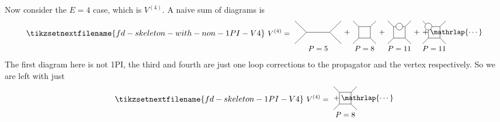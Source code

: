 \documentclass[fleqn]{NotesClass}
\begin{document}
    Now consider the \(E = 4\) case, which is \(V^{(4)}\).
    A naive sum of diagrams is
    \begin{equation}
        \tikzsetnextfilename{fd-skeleton-with-non-1PI-V4}
        \begin{tikzpicture}[
            baseline = (V.base),
            font=\small
            ]
            \node[left] (V) at (0, 0) {\(V^{(4)} = {}\)};
            \draw (0, -0.5) -- (0.5, 0);
            \draw (0, 0.5) -- (0.5, 0);
            \draw (0.5, 0) -- (1.5, 0);
            \draw (1.5, 0) -- (2, -0.5);
            \draw (1.5, 0) -- (2, 0.5);
            \node at (2.25, 0) {\(+\)};
            \node at (1, -0.7) {\(P = 5\)};
            \draw (2.75, -0.25) rectangle (3.25, 0.25);
            \draw (2.75, -0.25) -- (2.5, -0.5);
            \draw (2.75, 0.25) -- (2.5, 0.5);
            \draw (3.25, -0.25) -- (3.5, -0.5);
            \draw (3.25, 0.25) -- (3.5, 0.5);
            \node at (3, -0.7) {\(P = 8\)};
            \node at (3.75, 0) {\(+\)};
            \draw (4.65, 0.25) -- (4.75, 0.25) -- (4.75, -0.25) -- (4.25, -0.25) -- (4.25, 0.25) -- (4.35, 0.25);
            \draw (4.5, 0.25) circle [radius=0.15];
            \draw (4.25, -0.25) -- (4, -0.5);
            \draw (4.25, 0.25) -- (4, 0.5);
            \draw (4.75, -0.25) -- (5, -0.5);
            \draw (4.75, 0.25) -- (5, 0.5);
            \node at (4.5, -0.7) {\(P = 11\)};
            \node at (5.25, 0) {\(+\)};
            \draw (5.9, 0.25) -- (6.25, 0.25) -- (6.25, -0.25) -- (5.75, -0.25) -- (5.75, 0.1);
            \draw (5.75, 0.25) circle [radius = 0.15];
            \draw (5.75, -0.25) -- (5.5, -0.5);
            \draw (5.5, 0.5) -- ++ (-45:0.2);
            \draw (6.25, -0.25) -- (6.5, -0.5);
            \draw (6.25, 0.25) -- (6.5, 0.5);
            \node at (6, -0.7) {\(P = 11\)};
            \node at (6.75, 0) {\({} + \mathrlap{\dotsb}\)};
            \node at (7.25, 0) {};
        \end{tikzpicture}
    \end{equation}
    The first diagram here is not 1PI, the third and fourth are just one loop corrections to the propagator and the vertex respectively.
    So we are left with just
    \begin{equation}
        \tikzsetnextfilename{fd-skeleton-1PI-V4}
        \begin{tikzpicture}[
            baseline = (V.base),
            font=\small
            ]
            \node[left] (V) at (0, 0) {\(V^{(4)} = {}\)};
            \draw (0.25, -0.25) rectangle (0.75, 0.25);
            \draw (0.25, -0.25) -- (0, -0.5);
            \draw (0.25, 0.25) -- (0, 0.5);
            \draw (0.75, -0.25) -- (1, -0.5);
            \draw (0.75, 0.25) -- (1, 0.5);
            \node at (0.5, -0.7) {\(P = 8\)};
            \node at (1.25, 0) {\({} + \mathrlap{\dotsb}\)};
            \node at (1.85, 0) {};
        \end{tikzpicture}
    \end{equation}
\end{document}
